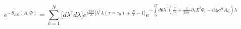 \begin{equation}
e^{-S_{\partial\Sigma}(A,\Phi)}=\sum\limits_{k=1}^N \bigl\lbrack
d\lambda^\dag d\lambda\bigr\rbrack e^{i\frac{2\pi k}{N}
\lbrack\lambda^\dag\lambda(\tau=\tau_0)+\frac{N}{2}-1\rbrack}
e^{-\int\limits_0^{2\pi}d\theta\lambda^\dag(\frac{d}{d\theta}+
\frac{1}{2\pi\alpha^\prime}\partial_r
X^i\Phi_i-i\partial_\theta\sigma^\alpha
A_\alpha)\lambda}\label{model}
\end{equation}

